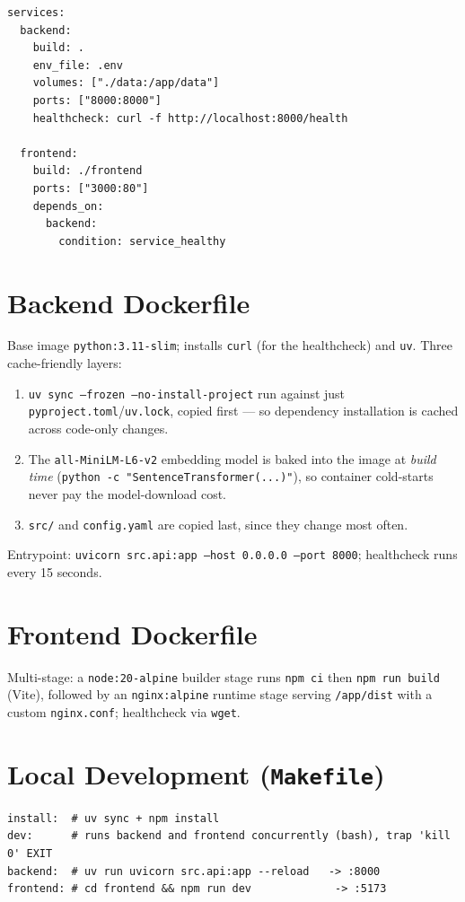 \documentclass[11pt,a4paper]{report}
\newcommand{\code}[1]{\texttt{\small #1}}
\newcommand{\file}[1]{\texttt{\small\color{accent!70!black}#1}}
\begin{document}
\begin{lstlisting}[caption={docker-compose.yml (structure)}]
services:
  backend:
    build: .
    env_file: .env
    volumes: ["./data:/app/data"]
    ports: ["8000:8000"]
    healthcheck: curl -f http://localhost:8000/health

  frontend:
    build: ./frontend
    ports: ["3000:80"]
    depends_on:
      backend:
        condition: service_healthy
\end{lstlisting}

\section{Backend Dockerfile}

Base image \code{python:3.11-slim}; installs \code{curl} (for the healthcheck) and \code{uv}. Three cache-friendly layers:
\begin{enumerate}
\item \code{uv sync --frozen --no-install-project} run against just \file{pyproject.toml}/\file{uv.lock}, copied first — so dependency installation is cached across code-only changes.
\item The \code{all-MiniLM-L6-v2} embedding model is baked into the image at \emph{build time} (\code{python -c "SentenceTransformer(...)"}), so container cold-starts never pay the model-download cost.
\item \file{src/} and \file{config.yaml} are copied last, since they change most often.
\end{enumerate}
Entrypoint: \code{uvicorn src.api:app --host 0.0.0.0 --port 8000}; healthcheck runs every 15 seconds.

\section{Frontend Dockerfile}

Multi-stage: a \code{node:20-alpine} builder stage runs \code{npm ci} then \code{npm run build} (Vite), followed by an \code{nginx:alpine} runtime stage serving \code{/app/dist} with a custom \code{nginx.conf}; healthcheck via \code{wget}.

\section{Local Development (\file{Makefile})}

\begin{lstlisting}[caption={Makefile targets}]
install:  # uv sync + npm install
dev:      # runs backend and frontend concurrently (bash), trap 'kill 0' EXIT
backend:  # uv run uvicorn src.api:app --reload   -> :8000
frontend: # cd frontend && npm run dev             -> :5173
\end{lstlisting}
\end{document}
